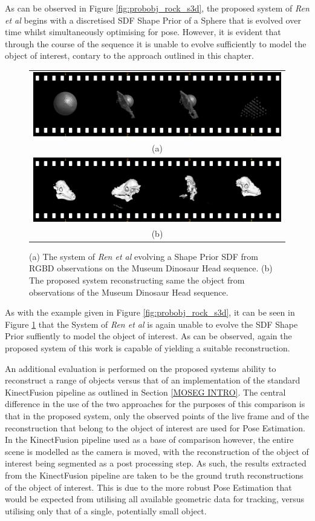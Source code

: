 As can be observed in Figure \ref{fig:probobj_rock_s3d}, the proposed system of 
\textit{Ren et al} begins with a discretised SDF Shape Prior of a Sphere that is 
evolved over time whilst simultaneously optimising for pose. However, it is evident 
that through the course of the sequence it is unable to evolve sufficiently to model 
the object of interest, contary to the approach outlined in this chapter.

\begin{figure}[ht]
  \label{fig:probobj_dino_s3d}
  \centering
  \begin{tabular}{@{}c@{}}
    \includegraphics[width=.6\linewidth]{figures/object_recon/strips/dino_s3d.png} \\
    (a) \\
    \includegraphics[width=.6\linewidth]{figures/object_recon/strips/dino.png} \\ 
    (b) \\
  \end{tabular}
  \caption{(a) The system of \textit{Ren et al} \cite{Ren2013} evolving a Shape Prior SDF 
  from RGBD observations on the Museum Dinosaur Head sequence. (b) The proposed system 
  reconstructing same the object from observations of the Museum Dinosaur Head sequence.}
\end{figure}

As with the example given in Figure \ref{fig:probobj_rock_s3d}, it can be seen in 
Figure \ref{fig:probobj_dino_s3d} that the System of \textit{Ren et al} is again 
unable to evolve the SDF Shape Prior suffiently to model the object of interest. As 
can be observed, again the proposed system of this work is capable of yielding a suitable 
reconstruction.

An additional evaluation is performed on the proposed systems ability to reconstruct 
a range of objects versus that of an implementation of the standard KinectFusion 
pipeline as outlined in Section \ref{MOSEG INTRO}. The central difference in the use 
of the two approaches for the purposes of this comparison is that in the proposed system, 
only the observed points of the live frame and of the reconstruction that belong to the 
object of interest are used for Pose Estimation. In the KinectFusion pipeline used 
as a base of comparison however, the entire scene is modelled as the camera is moved, 
with the reconstruction of the object of interest being segmented as a post processing 
step. As such, the results extracted from the KinectFusion pipeline are taken to be the 
ground truth reconstructions of the object of interest. This is due to the more robust 
Pose Estimation that would be expected from utilising all available geometric data 
for tracking, versus utilising only that of a single, potentially small object.

